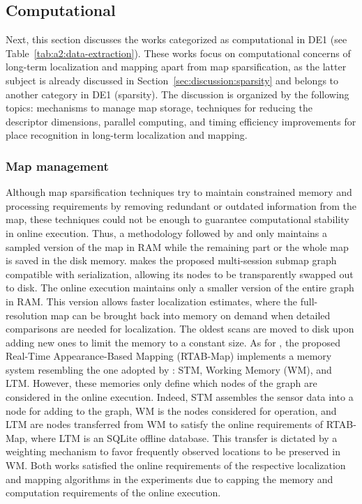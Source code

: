 \subsection{Computational}
\label{sec:discussion:computational}

Next, this section discusses the works categorized as computational in DE1 (see Table~\ref{tab:a2:data-extraction}). These works focus on computational concerns of long-term localization and mapping apart from map sparsification, as the latter subject is already discussed in Section~\ref{sec:discussion:sparsity} and belongs to another category in DE1 (sparsity).
The discussion is organized by the following topics: mechanisms to manage map storage, techniques for reducing the descriptor dimensions, parallel computing, and timing efficiency improvements for place recognition in long-term localization and mapping.



\subsubsection{Map management}

Although map sparsification techniques try to maintain constrained memory and processing requirements by removing redundant or outdated information from the map, these techniques could not be enough to guarantee computational stability in online execution. Thus, a methodology followed by \cite{oberländer-et-al:2013:6766479} and \cite{labbé-michaud:2019:21831} only maintains a sampled version of the map in RAM while the remaining part or the whole map is saved in the disk memory.
\cite{oberländer-et-al:2013:6766479} makes the proposed multi-session submap graph compatible with serialization, allowing its nodes to be transparently swapped out to disk. The online execution maintains only a smaller version of the entire graph in RAM. This version allows faster localization estimates, where the full-resolution map can be brought back into memory on demand when detailed comparisons are needed for localization. The oldest scans are moved to disk upon adding new ones to limit the memory to a constant size.
As for \cite{labbé-michaud:2019:21831}, the proposed Real-Time Appearance-Based Mapping (RTAB-Map) implements a memory system resembling the one adopted by \cite{dayoub-et-al:2011:013}: STM, Working Memory (WM), and LTM. However, these memories only define which nodes of the graph are considered in the online execution. Indeed, STM assembles the sensor data into a node for adding to the graph, WM is the nodes considered for operation, and LTM are nodes transferred from WM to satisfy the online requirements of RTAB-Map, where LTM is an SQLite offline database. This transfer is dictated by a weighting mechanism to favor frequently observed locations to be preserved in WM.
Both works satisfied the online requirements of the respective localization and mapping algorithms in the experiments due to capping the memory and computation requirements of the online execution.

